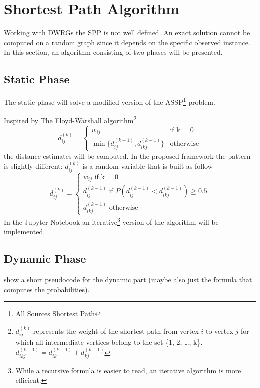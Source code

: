 \section{Shortest Path Algorithm}

Working with DWRGs the SPP is not well defined.
An exact solution cannot be computed on a random graph since it depends on the specific observed instance.
In this section, an algorithm consisting of two phases will be presented.

\subsection{Static Phase}

The static phase will solve a modified version of the ASSP\footnote{All Sources Shortest Path} problem.

Inspired by The Floyd-Warshall\cite{cormen2010introduction} algorithm\footnote{$d_{ij}^{(k)}$ represents the weight of the shortest path from vertex $i$ to vertex $j$ for which all intermediate vertices belong to the set \{1, 2, \dots, k\}. $d_{ikj}^{(k-1)} = d_{ik}^{(k-1)} + d_{kj}^{(k-1)}$}
\begin{equation*}
	d_{ij}^{(k)} = 
	\begin{cases}
		w_{ij} & \text{if k = 0} \\
		\min\{d_{ij}^{(k-1)}, d_{ikj}^{(k-1)}\} & \text{otherwise}
	\end{cases}
\end{equation*}
the distance estimates will be computed.
In the proposed framework the pattern is slightly different: $d_{ij}^{(k)}$ is a random variable that is built as follow
\begin{equation*}
	d_{ij}^{(k)} = 
	\begin{cases}
		w_{ij} \text{ \ \ \ if k = 0} \\
		d_{ij}^{(k-1)} \text{ if } P(d_{ij}^{(k-1)} < d_{ikj}^{(k-1)}) \geq 0.5 \\
		d_{ikj}^{(k-1)} \text{ otherwise}
	\end{cases}
\end{equation*}
In the Jupyter Notebook an iterative\footnote{While a recursive formula is easier to read, an iterative algorithm is more efficient.} version of the algorithm will be implemented.
\subsection{Dynamic Phase}
show a short pseudocode for the dynamic part (maybe also just the formula that computes the probabilities).

